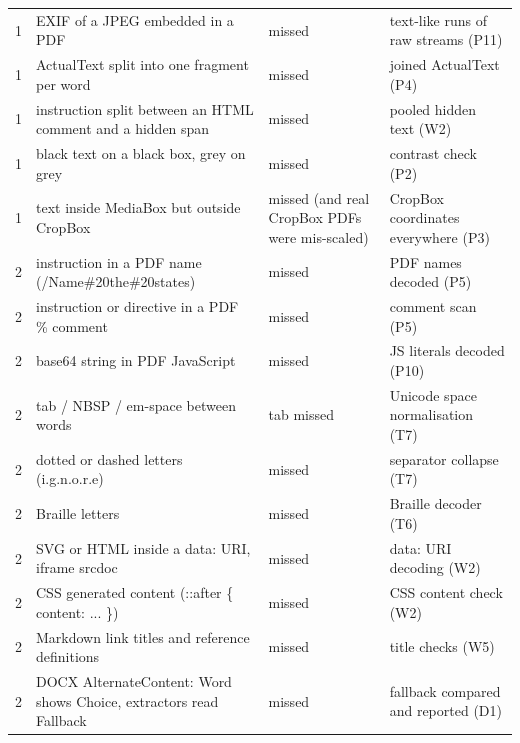 \documentclass[10pt,a4paper]{article}
\begin{document}
\begin{longtable}{@{}P{0.8cm}P{7.6cm}P{3.2cm}P{5.4cm}@{}}
1 & \footnotesize EXIF of a JPEG embedded in a PDF & \footnotesize \textcolor{bad}{missed} & \footnotesize text-like runs of raw streams (P11)\\
1 & \footnotesize ActualText split into one fragment per word & \footnotesize \textcolor{bad}{missed} & \footnotesize joined ActualText (P4)\\
1 & \footnotesize instruction split between an HTML comment and a hidden span & \footnotesize \textcolor{bad}{missed} & \footnotesize pooled hidden text (W2)\\
1 & \footnotesize black text on a black box, grey on grey & \footnotesize \textcolor{bad}{missed} & \footnotesize contrast check (P2)\\
1 & \footnotesize text inside MediaBox but outside CropBox & \footnotesize \textcolor{bad}{missed (and real CropBox PDFs were mis-scaled)} & \footnotesize CropBox coordinates everywhere (P3)\\
2 & \footnotesize instruction in a PDF name (/Name\#20the\#20states) & \footnotesize \textcolor{bad}{missed} & \footnotesize PDF names decoded (P5)\\
2 & \footnotesize instruction or directive in a PDF \% comment & \footnotesize \textcolor{bad}{missed} & \footnotesize comment scan (P5)\\
2 & \footnotesize base64 string in PDF JavaScript & \footnotesize \textcolor{bad}{missed} & \footnotesize JS literals decoded (P10)\\
2 & \footnotesize tab / NBSP / em-space between words & \footnotesize \textcolor{bad}{tab missed} & \footnotesize Unicode space normalisation (T7)\\
2 & \footnotesize dotted or dashed letters (i.g.n.o.r.e) & \footnotesize \textcolor{bad}{missed} & \footnotesize separator collapse (T7)\\
2 & \footnotesize Braille letters & \footnotesize \textcolor{bad}{missed} & \footnotesize Braille decoder (T6)\\
2 & \footnotesize SVG or HTML inside a data: URI, iframe srcdoc & \footnotesize \textcolor{bad}{missed} & \footnotesize data: URI decoding (W2)\\
2 & \footnotesize CSS generated content (::after \{ content: ... \}) & \footnotesize \textcolor{bad}{missed} & \footnotesize CSS content check (W2)\\
2 & \footnotesize Markdown link titles and reference definitions & \footnotesize \textcolor{bad}{missed} & \footnotesize title checks (W5)\\
2 & \footnotesize DOCX AlternateContent: Word shows Choice, extractors read Fallback & \footnotesize \textcolor{bad}{missed} & \footnotesize fallback compared and reported (D1)\\

\end{longtable}
\end{document}
